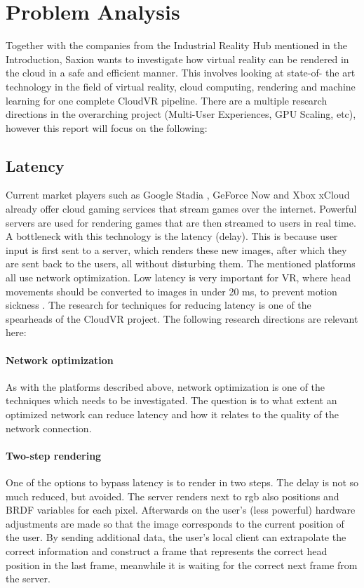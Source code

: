 \section{Problem Analysis}

Together with the companies from the Industrial Reality Hub mentioned in the Introduction, Saxion wants to investigate how virtual reality
can be rendered in the cloud in a safe and efficient manner. This involves looking at state-of-
the art technology in the field of virtual reality, cloud computing, rendering and machine learning for one
complete CloudVR pipeline. There are a multiple research directions in the overarching project (Multi-User Experiences, GPU Scaling, etc), however this report will focus on the following:

\subsection{Latency}
Current market players such as Google Stadia \parencite{stadia}, GeForce Now \parencite{geforcenow} and Xbox xCloud \parencite{xcloud} already offer cloud gaming services that stream games over the internet. Powerful servers are used for rendering games that are then streamed to users in real time. A bottleneck with this technology is the latency (delay). This is because user input is first sent to a server, which renders these new images, after which they are sent back to the users, all without disturbing them. The mentioned platforms all use network optimization. Low latency is very important for VR, where head movements should be converted to images in under 20 \acrfull{ms}, to prevent motion sickness \parencite{valvevrlatency}. The research for techniques for reducing latency is one of the spearheads of the CloudVR project. The following research directions are relevant here:

\paragraph{Network optimization}
As with the platforms described above, network optimization is one of the techniques
which needs to be investigated. The question is to what extent an optimized network
can reduce latency and how it relates to the quality of the network connection.
\paragraph{Two-step rendering}
One of the options to bypass latency is to render in two steps.
The delay is not so much reduced, but avoided. The server renders next to
\acrshort{rgb} also positions and BRDF variables for each pixel. Afterwards on the
user's (less powerful) hardware adjustments are made so that the image corresponds to the current position of the user.
By sending additional data, the user's local client can extrapolate the correct information and construct a frame that represents the correct head position in the last frame, meanwhile it is waiting for the  correct next frame from the server.
